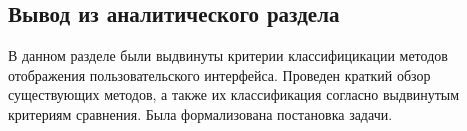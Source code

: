 \newpage{}
\subsection{Вывод из аналитического раздела}

В данном разделе были выдвинуты критерии классифицикации методов отображения пользовательского интерфейса.
Проведен краткий обзор существующих методов, а также их классификация согласно выдвинутым критериям сравнения. 
Была формализована постановка задачи.

\pagebreak
